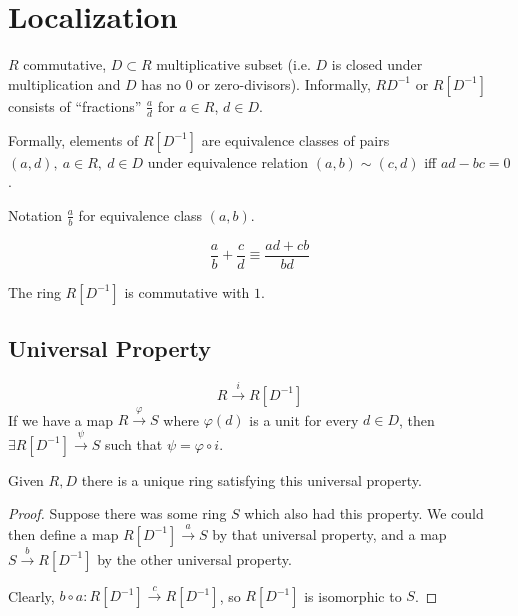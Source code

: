 \documentclass[a4paper,twoside,master.tex]{subfiles}
\begin{document}

\section{Localization}
\label{sec:localization}

$ R $ commutative, $ D \subset R $ multiplicative subset (i.e. $ D $ is closed under multiplication and $ D $ has no $ 0 $ or zero-divisors). Informally, $ R D^{-1} $ or $ R[D^{-1}] $ consists of ``fractions'' $ \frac{a}{d} $ for $ a \in R $, $ d \in D $.

Formally, elements of $ R[D^{-1}] $ are equivalence classes of pairs $ (a,d),\ a \in R,\ d \in D $ under equivalence relation $ (a,b) \sim (c,d) $ iff $ ad - b c = 0 $.

\begin{note}{Notation}
    $ \frac{a}{b} $ for equivalence class $ (a,b) $.
\end{note}

\begin{equation}
    \frac{a}{b} + \frac{c}{d} \equiv \frac{ad + c b}{b d}
\end{equation}

The ring $ R[D^{-1}] $ is commutative with $ 1 $.

\subsection{Universal Property}
\label{sub:universal_property}

\begin{equation}
    R \xrightarrow{i} R[D^{-1}]
\end{equation}
If we have a map $ R \xrightarrow{\varphi} S $ where $ \varphi(d) $ is a unit for every $ d \in D $, then $ \exists R[D^{-1}] \xrightarrow{\psi} S $ such that $ \psi = \varphi \circ i $.

\begin{claim}
    Given $ R, D $ there is a unique ring satisfying this universal property.
\end{claim}
\begin{proof}
    Suppose there was some ring $ S $ which also had this property. We could then define a map $ R[D^{-1}] \xrightarrow{a} S $ by that universal property, and a map $ S \xrightarrow{b} R[D^{-1}] $ by the other universal property.

    Clearly, $ b \circ a\colon R[D^{-1}] \xrightarrow{c} R[D^{-1}] $, so $ R[D^{-1}] $ is isomorphic to $ S $.
\end{proof}
\end{document}
